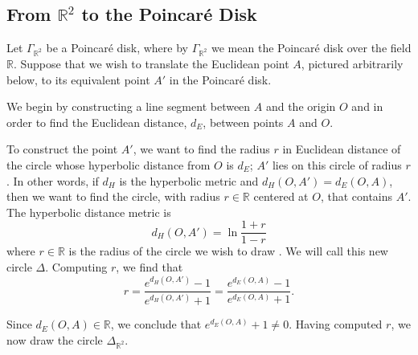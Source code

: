 \documentclass[12pt]{article}
\newcommand{\R}{\mathbb{R}}
\newcommand{\poincare}{Poincar\'{e} }
\theoremstyle{plain}
\theoremstyle{definition}
\begin{document}
\newpage
\begin{appendices}
\section{From $\R^2$ to the \poincare Disk} \label{appendixA}

Let $\Gamma_{\R^2}$ be a \poincare disk, where by $\Gamma_{\R^2}$ we mean the \poincare disk over the field $\R$. Suppose that we wish to translate the Euclidean point $A$, pictured arbitrarily below, to its equivalent point $A'$ in the \poincare disk.

\begin{center}
\end{center}

We begin by constructing a line segment between $A$ and the origin $O$ and in order to find the Euclidean distance, $d_E$, between points $A$ and $O$.

\begin{center}
\end{center}

To construct the point $A'$, we want to find the radius $r$ in Euclidean distance of the circle whose hyperbolic distance from $O$ is $d_E$; $A'$ lies on this circle of radius $r$. In other words, if $d_H$ is the hyperbolic metric and $d_H(O,A') = d_E(O,A)$, then we want to find the circle, with radius $r\in\R$ centered at $O$, that contains $A'$. The hyperbolic distance metric is
\[
	d_H(O,A') = \ln\frac{1 + r}{1 - r}
\]
where $r\in\R$ is the radius of the circle we wish to draw \cite{hyperbolic_metric}. We will call this new circle $\Delta$. Computing $r$, we find that
\[
	r = \frac{e^{d_H(O,A')} - 1}{e^{d_H(O,A')} + 1} =  \frac{e^{d_E(O,A)} - 1}{e^{d_E(O,A)} + 1}.
\]

Since $d_E(O,A)\in\R$, we conclude that $e^{d_E(O,A)} + 1 \neq 0$. Having computed $r$, we now draw the circle $\Delta_{\R^2}$.


\end{appendices}
\end{document}
